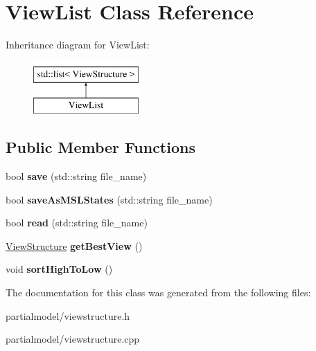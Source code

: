 \hypertarget{classViewList}{}\section{View\+List Class Reference}
\label{classViewList}
Inheritance diagram for View\+List\+:\begin{figure}[H]
\begin{center}
\leavevmode
\includegraphics[height=2.000000cm]{classViewList}
\end{center}
\end{figure}
\subsection*{Public Member Functions}
\begin{DoxyCompactItemize}
\item 
bool {\bfseries save} (std\+::string file\+\_\+name)\hypertarget{classViewList_a2d5e411130ffff034c19b94e36d1d794}{}\label{classViewList_a2d5e411130ffff034c19b94e36d1d794}

\item 
bool {\bfseries save\+As\+M\+S\+L\+States} (std\+::string file\+\_\+name)\hypertarget{classViewList_aaf8953fb8a9a7ef1ff5aef717be9ef83}{}\label{classViewList_aaf8953fb8a9a7ef1ff5aef717be9ef83}

\item 
bool {\bfseries read} (std\+::string file\+\_\+name)\hypertarget{classViewList_aa696263f92488a5d8b2111619b628c20}{}\label{classViewList_aa696263f92488a5d8b2111619b628c20}

\item 
\hyperlink{classViewStructure}{View\+Structure} {\bfseries get\+Best\+View} ()\hypertarget{classViewList_a1e7373f6950ca214bc009ed08035e2d3}{}\label{classViewList_a1e7373f6950ca214bc009ed08035e2d3}

\item 
void {\bfseries sort\+High\+To\+Low} ()\hypertarget{classViewList_ab95513795727188e63a18c8cff09f451}{}\label{classViewList_ab95513795727188e63a18c8cff09f451}

\end{DoxyCompactItemize}


The documentation for this class was generated from the following files\+:\begin{DoxyCompactItemize}
\item 
partialmodel/viewstructure.\+h\item 
partialmodel/viewstructure.\+cpp\end{DoxyCompactItemize}
